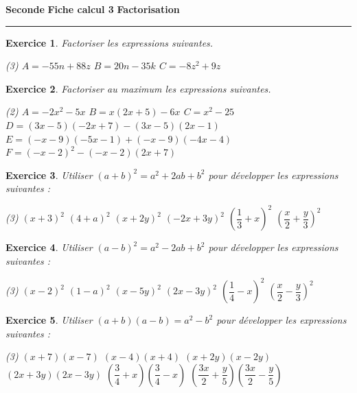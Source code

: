 \documentclass[a4paper,12pt,fleqn]{article}
\newtheorem{exercice}{Exercice}
\begin{document}
{
  \normalsize
  \textbf{Seconde} \hfill \textbf{Fiche calcul 3} \hfill \textbf{Factorisation}
  \newline
}

\hrule

\begin{exercice}
Factoriser les expressions suivantes.    
\begin{tasks}(3)
	\task  $A=-55n+88z$ 
	\task  $B=20n-35k$ 
	\task  $C=-8z^2+9z$ 
\end{tasks}
\end{exercice}

\begin{exercice}{}{}
Factoriser au maximum les expressions suivantes.


\begin{tasks}(2)
	\task $A=-2x^{2}-5x$
	\task $B=x(2x+5)-6x$
	\task $C=x^2-25$
	\task $D=(3x-5)(-2x+7)-(3x-5)(2x-1)$
	\task $E=(-x-9)(-5x-1)+(-x-9)(-4x-4)$
	\task $F=(-x-2)^2-(-x-2)(2x+7)$
\end{tasks}
\end{exercice}

\begin{exercice}
Utiliser $(a+b)^2 = a^2+2ab+b^2$ pour développer les expressions suivantes :
 \begin{tasks}(3)
    \task $(x+3)^2$
    \task $(4+a)^2$
    \task $(x+2y)^2$
    \task $(-2x+3y)^2$
    \task $\left(\dfrac{1}{3}+x\right)^2$
    \task $\left(\dfrac{x}{2}+\dfrac{y}{3}\right)^2$
 \end{tasks} 
\end{exercice}
 
\begin{exercice}
Utiliser $(a-b)^2 = a^2-2ab+b^2$ pour développer les expressions suivantes :
 
 \begin{tasks}(3)
    \task $(x-2)^2$
    \task $(1-a)^2$
    \task $(x-5y)^2$
    \task $(2x-3y)^2$
    \task $\left(\dfrac{1}{4}-x\right)^2$
    \task $\left(\dfrac{x}{2}-\dfrac{y}{3}\right)^2$
 \end{tasks} 
\end{exercice}
 
\begin{exercice}
Utiliser $(a+b)(a-b) = a^2-b^2$ pour développer les expressions suivantes :
 
 \begin{tasks}(3)
    \task $(x+7)(x-7)$
    \task $(x-4)(x+4)$
    \task $(x+2y)(x-2y)$
    \task $(2x+3y)(2x-3y)$
    \task $\left(\dfrac{3}{4}+x\right)\left(\dfrac{3}{4}-x\right)$
    \task $\left(\dfrac{3x}{2}+\dfrac{y}{5}\right)\left(\dfrac{3x}{2}-\dfrac{y}{5}\right)$
 \end{tasks} 
\end{exercice}
 
\end{document}
